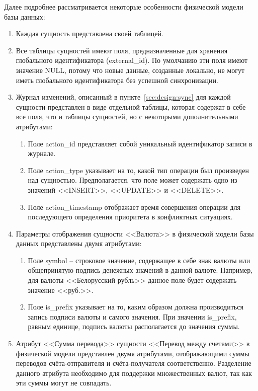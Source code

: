 Далее подробнее рассматривается некоторые особенности физической модели базы данных:
\begin{enumerate}
    \item Каждая сущность представлена своей таблицей.
    \item Все таблицы сущностей имеют поля, предназначенные для хранения глобального идентификатора (external\_id).
    По умолчанию эти поля имеют значение NULL, потому что новые данные, созданные локально, не могут иметь глобального идентификатора без успешной синхронизации.
    \item Журнал изменений, описанный в пункте~\ref{sec:design:sync} для каждой сущности представлен в виде отдельной таблицы, которая содержат в себе все поля, что и таблицы сущностей, но с некоторыми дополнительными атрибутами:
    \begin{enumerate}
        \item Поле action\_id представляет собой уникальный идентификатор записи в журнале.
        \item Поле action\_type указывает на то, какой тип операции был произведен над сущностью.
        Предполагается, что поле может содержать одно из значений <<INSERT>>, <<UPDATE>> и <<DELETE>>.
        \item Поле action\_timestamp отображает время совершения операции для последующего определения приоритета в конфликтных ситуациях.
    \end{enumerate}
    \item Параметры отображения сущности <<Валюта>> в физической модели базы данных представлены двумя атрибутами:
    \begin{enumerate}
        \item Поле symbol -- строковое значение, содержащее в себе знак валюты или общепринятую подпись денежных значений в данной валюте.
        Например, для валюты <<Белорусский рубль>> данное поле будет содержать значение <<руб.>>.
        \item Поле is\_prefix указывает на то, каким образом должна производиться запись подписи валюты и самого значения.
        При значении is\_prefix, равным единице, подпись валюты располагается до значения суммы.
    \end{enumerate}
    \item Атрибут <<Сумма перевода>> сущности <<Перевод между счетами>> в физической модели представлен двумя атрибутами, отображающими суммы переводов счёта-отправителя и счёта-получателя соответственно.
    Разделение данного атрибута необходимо для поддержки множественных валют, так как эти суммы могут не совпадать.
\end{enumerate}

